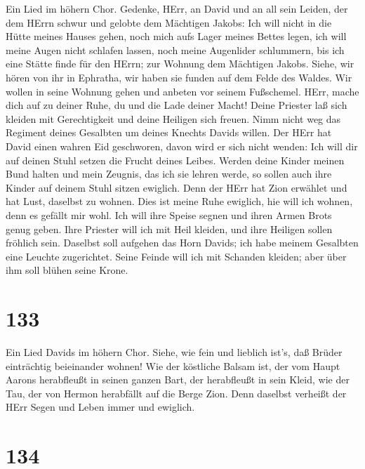  Ein Lied im höhern Chor. Gedenke, HErr, an David und an all
sein Leiden,  der dem HErrn schwur und gelobte dem Mächtigen
Jakobs:  Ich will nicht in die Hütte meines Hauses gehen,
noch mich aufs Lager meines Bettes legen,  ich will meine
Augen nicht schlafen lassen, noch meine Augenlider schlummern,
 bis ich eine Stätte finde für den HErrn; zur Wohnung dem
Mächtigen Jakobs.  Siehe, wir hören von ihr in Ephratha, wir
haben sie funden auf dem Felde des Waldes.  Wir wollen in
seine Wohnung gehen und anbeten vor seinem Fußschemel. 
HErr, mache dich auf zu deiner Ruhe, du und die Lade deiner Macht!
 Deine Priester laß sich kleiden mit Gerechtigkeit und deine
Heiligen sich freuen.  Nimm nicht weg das Regiment deines
Gesalbten um deines Knechts Davids willen.  Der HErr hat
David einen wahren Eid geschworen, davon wird er sich nicht wenden: Ich
will dir auf deinen Stuhl setzen die Frucht deines Leibes. 
Werden deine Kinder meinen Bund halten und mein Zeugnis, das ich sie
lehren werde, so sollen auch ihre Kinder auf deinem Stuhl sitzen
ewiglich.  Denn der HErr hat Zion erwählet und hat Lust,
daselbst zu wohnen.  Dies ist meine Ruhe ewiglich, hie will
ich wohnen, denn es gefällt mir wohl.  Ich will ihre Speise
segnen und ihren Armen Brots genug geben.  Ihre Priester
will ich mit Heil kleiden, und ihre Heiligen sollen fröhlich sein.
 Daselbst soll aufgehen das Horn Davids; ich habe meinem
Gesalbten eine Leuchte zugerichtet.  Seine Feinde will ich
mit Schanden kleiden; aber über ihm soll blühen seine Krone.

\hypertarget{section-132}{%
\section{133}\label{section-132}}

 Ein Lied Davids im höhern Chor. Siehe, wie fein und
lieblich ist's, daß Brüder einträchtig beieinander wohnen! 
Wie der köstliche Balsam ist, der vom Haupt Aarons herabfleußt in seinen
ganzen Bart, der herabfleußt in sein Kleid,  wie der Tau,
der von Hermon herabfällt auf die Berge Zion. Denn daselbst verheißt der
HErr Segen und Leben immer und ewiglich.

\hypertarget{section-133}{%
\section{134}\label{section-133}}

